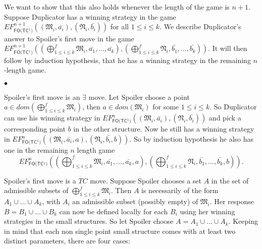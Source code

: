 \documentclass{LMCS}
\newcommand{\frM}{\mathfrak{M}}
\newcommand{\frN}{\mathfrak{N}}
\newcommand{\fotc}{\textsf{FO(TC$^1$)}\xspace}
\begin{document}
We want to show that this also holds whenever the length of the game
is $n+1$. Suppose Duplicator has a winning strategy in the game
$EF_\fotc^{n+1}((\frM_i,\bar{a_i}),(\frN_i,\bar{b_i}))$ for all $1
\leq i\leq k$. We describe Duplicator's answer to Spoiler's first
move in the game $EF_\fotc^{n+1}((\bigoplus_{ 1 \leq i \leq k}^f \frM_i,
\bar{a_1},\ldots,\bar{a_k}), (\bigoplus_{ 1 \leq i \leq
k}^f \frN_i, \bar{b_1},\ldots,\bar{b_k}))$. It will then follow by
induction hypothesis, that he has a winning strategy in the
remaining $n$-length game.
\begin{iteMize}{$\bullet$}
\item   Spoiler's first move is an $\exists$ move. Let Spoiler choose a point $a \in
dom(\bigoplus_{1 \leq i \leq k}^f \frM_i)$, then $a \in
dom(\frM_i)$ for some $1\leq i\leq k$. So Duplicator can use his
winning strategy in
$EF_\fotc^n((\frM_i,\bar{a_i}),(\frN_i,\bar{b_i}))$ and pick a
corresponding point $b$ in the other structure. Now he still has a
winning strategy in
$EF_\fotc^n((\frM_i,\bar{a_i},a),(\frN_i,\bar{b_i},b))$. So by
induction hypothesis he also has one in the remaining $n$ length
game $$EF_\fotc^n((\bigoplus_{1\leq i\leq k}^f \frM_i,
\bar{a_1},\ldots,\bar{a_k},a), (\bigoplus_{ 1 \leq i \leq
k}^f \frN_i, \bar{b_1},\ldots,\bar{b_k},b)).$$
\item   Spoiler's first move is a $TC$ move. Suppose Spoiler chooses a set
$A$ in the set of admissible subsets of $\bigoplus_{1 \leq
i \leq k}^f \frM_i$. Then $A$ is necessarily of the form $A_1 \cup
\ldots \cup A_k$, with $A_i$ an admissible subset (possibly empty)
of $\frM_i$. Her response $B=B_1 \cup \ldots \cup B_k$ can now be
defined locally for each $B_i$ using her winning strategies in the
small structures. So let Spoiler choose $A=A_1 \cup \ldots \cup A_k$.
Keeping in mind that each non single point small structure comes with
at least two distinct parameters, there are four cases:
\end{iteMize}
\end{document}
